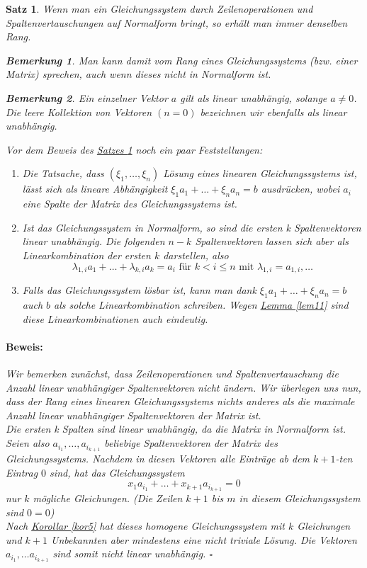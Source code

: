 \documentclass{report}
\newcommand{\lb}{\lambda}
\theoremstyle{customrem}
\newtheorem*{bem}{Bemerkung}
\theoremstyle{customdef}
\newtheorem{satz}[definition]{Satz}
\renewenvironment{proof}{\vspace{-.75cm}\paragraph{Beweis: }}{\hfill$\square$}
\begin{document}
	\begin{satz}
		\label{satz12}
		Wenn man ein Gleichungssystem durch Zeilenoperationen und Spaltenvertauschungen auf Normalform bringt, so erhält man immer denselben Rang.		
		\begin{bem}
			Man kann damit vom Rang eines Gleichungssystems (bzw. einer Matrix) sprechen, auch wenn dieses nicht in Normalform ist.
		\end{bem}
		\begin{bem}
			Ein einzelner Vektor $a$ gilt als linear unabhängig, solange $a \neq 0$. Die leere Kollektion von Vektoren $(n=0)$ bezeichnen wir ebenfalls als linear unabhängig.
		\end{bem}
		\noindent Vor dem Beweis des \hyperref[satz12]{Satzes \ref{satz12}} noch ein paar Feststellungen:
		\begin{enumerate}
			\item Die Tatsache, dass $(\xi_1, \dots, \xi_n)$ Lösung eines linearen Gleichungssystems ist, lässt sich als lineare Abhängigkeit 
			$\xi_1a_1 + \dots + \xi_n a_n = b$ ausdrücken, wobei $a_i$ eine Spalte der Matrix des Gleichungssystems ist.
			\item Ist das Gleichungssystem in Normalform, so sind die ersten k Spaltenvektoren linear unabhängig. Die folgenden $n-k$ Spaltenvektoren lassen sich aber als Linearkombination der ersten $k$ darstellen, also
			$$
			\lb_{1,i}a_1 + \dots + \lb_{k,i}a_k = a_i \text{ für } k < i \le n
			 \text{ mit }  \lb_{1,i} = a_{1,i}, \dots
			$$
			\item Falls das Gleichungssystem lösbar ist, kann man dank $\xi_1a_1 + \dots + \xi_n a_n = b$ auch $b$ als solche Linearkombination schreiben. Wegen \hyperref[lem11]{Lemma \ref{lem11}} sind diese Linearkombinationen auch eindeutig.
		\end{enumerate}
		\begin{proof}
			Wir bemerken zunächst, dass Zeilenoperationen und Spaltenvertauschung die Anzahl linear unabhängiger Spaltenvektoren nicht ändern.
			Wir überlegen uns nun, dass der Rang eines linearen Gleichungssystems nichts anderes als die maximale Anzahl linear unabhängiger Spaltenvektoren der Matrix ist.\\
			Die ersten k Spalten sind linear unabhängig, da die Matrix in Normalform ist. Seien also $a_{i_1}, \dots, a_{i_{k+1}}$ beliebige Spaltenvektoren der Matrix des Gleichungssystems. Nachdem in diesen Vektoren alle Einträge ab dem $k+1$-ten Eintrag $0$ sind, hat das Gleichungssystem \\
			$$
			x_1a_{i_1} + \dots + x_{k+1}a_{i_{k+1}} = 0
			$$
			nur $k$ mögliche Gleichungen. (Die Zeilen $k+1$ bis $m$ in diesem Gleichungssystem sind $0=0$)\\
			Nach \hyperref[kor5]{Korollar \ref{kor5}} hat dieses homogene Gleichungssystem mit $k$ Gleichungen und $k+1$ Unbekannten aber mindestens eine nicht triviale Lösung. Die Vektoren $a_{i_1}, \dots a_{i_{k+1}}$ sind somit nicht linear unabhängig.
		\end{proof}
	\end{satz}
\end{document}
